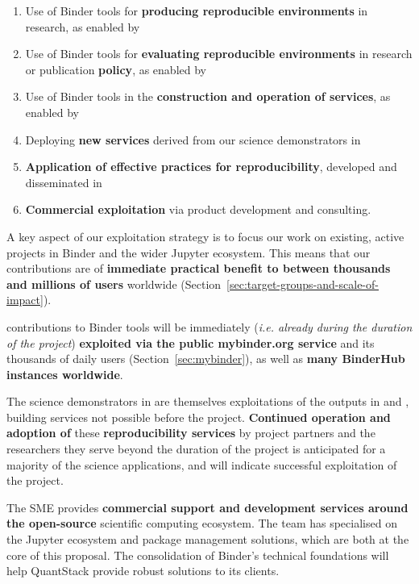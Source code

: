 \begin{enumerate}
  \item Use of Binder tools for \textbf{producing reproducible environments} in research, as enabled by 
  \item Use of Binder tools for \textbf{evaluating reproducible environments} in research or publication \textbf{policy}, as enabled by 
  \item Use of Binder tools in the \textbf{construction and operation of services}, as enabled by 
  \item Deploying \textbf{new services} derived from our science demonstrators in 
  \item \textbf{Application of effective practices for reproducibility}, developed and disseminated in 
  \item \textbf{Commercial exploitation} via product development and consulting.
\end{enumerate}

A key aspect of our exploitation strategy is to focus our work on existing,
active projects in Binder and the wider Jupyter ecosystem.
This means that our contributions are of \textbf{immediate practical benefit to between
  thousands and millions of users} worldwide (Section~\ref{sec:target-groups-and-scale-of-impact}).

\TheProject contributions to Binder tools will be immediately (\emph{i.e.
  already during the duration of the project}) \textbf{exploited via the public mybinder.org service}
and its thousands of daily users (Section~\ref{sec:mybinder}), as well as \textbf{many BinderHub instances worldwide}.

The science demonstrators in  are themselves exploitations of the outputs
in  and ,
building services not possible before the project.
\textbf{Continued operation and adoption of} these \textbf{reproducibility services} by project partners and the researchers they serve beyond
the duration of the project is anticipated for a majority of the science applications, and will indicate
successful exploitation of the project.


The  SME provides \textbf{commercial support and development services around the
open-source} scientific computing ecosystem. The team has specialised on the Jupyter ecosystem
and package management solutions, which are both at the core of this proposal. The consolidation
of Binder's technical foundations will help QuantStack provide robust solutions to its clients.

